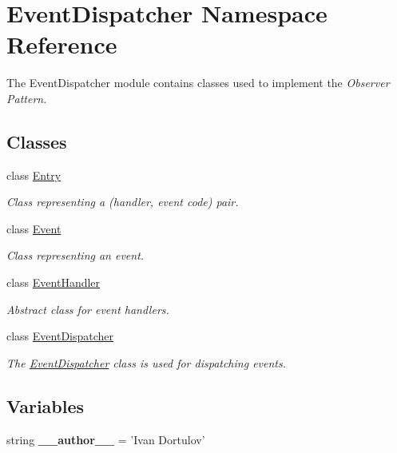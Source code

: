 \hypertarget{namespace_event_dispatcher}{\section{Event\-Dispatcher Namespace Reference}
\label{namespace_event_dispatcher}
}


The Event\-Dispatcher module contains classes used to implement the {\itshape Observer Pattern}.  


\subsection*{Classes}
\begin{DoxyCompactItemize}
\item 
class \hyperlink{class_event_dispatcher_1_1_entry}{Entry}
\begin{DoxyCompactList}\small\item\em Class representing a (handler, event code) pair. \end{DoxyCompactList}\item 
class \hyperlink{class_event_dispatcher_1_1_event}{Event}
\begin{DoxyCompactList}\small\item\em Class representing an event. \end{DoxyCompactList}\item 
class \hyperlink{class_event_dispatcher_1_1_event_handler}{Event\-Handler}
\begin{DoxyCompactList}\small\item\em Abstract class for event handlers. \end{DoxyCompactList}\item 
class \hyperlink{class_event_dispatcher_1_1_event_dispatcher}{Event\-Dispatcher}
\begin{DoxyCompactList}\small\item\em The \hyperlink{class_event_dispatcher_1_1_event_dispatcher}{Event\-Dispatcher} class is used for dispatching events. \end{DoxyCompactList}\end{DoxyCompactItemize}
\subsection*{Variables}
\begin{DoxyCompactItemize}
\item 
\hypertarget{namespace_event_dispatcher_aebf383ab1c47c4d3f05a6bb89e660f3e}{string {\bfseries \-\_\-\-\_\-author\-\_\-\-\_\-} = 'Ivan Dortulov'}\label{namespace_event_dispatcher_aebf383ab1c47c4d3f05a6bb89e660f3e}

\end{DoxyCompactItemize}


